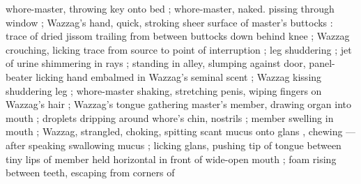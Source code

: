 whore-master, throwing key onto bed ; whore-master, naked. pissing through window ; Wazzag's hand,
quick, stroking sheer surface of master's buttocks : trace of dried jissom trailing from between
buttocks down behind knee ; Wazzag crouching, licking trace from source to point of interruption ;
leg shuddering ; jet of urine shimmering in rays ; standing in alley, slumping against door,
panel-beater licking hand embalmed in Wazzag's seminal scent ; Wazzag kissing shuddering leg ;
whore-master shaking, stretching penis, wiping fingers on Wazzag's hair ; Wazzag's tongue gathering
master's member, drawing organ into mouth ; droplets dripping around whore's chin, nostrils ; member
swelling in mouth  ; Wazzag, strangled, choking, spitting scant mucus onto glans , chewing --- after speaking {\dashcom} swallowing
mucus ; licking glans, pushing tip of tongue between tiny lips of member held horizontal in front of
wide-open mouth ; foam rising between teeth, escaping from corners of 

